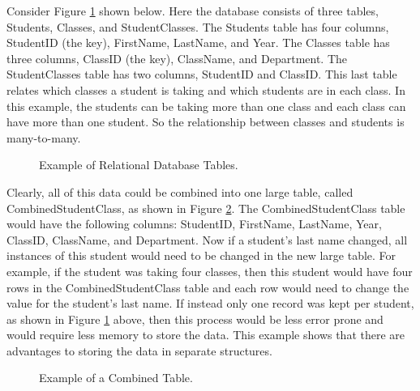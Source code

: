 \documentclass{article}[11pt]
\begin{document}
Consider Figure \ref{Fig:DBTab} shown below.  Here the database consists of
three tables, Students, Classes, and StudentClasses.  The Students table has
four columns, StudentID (the key), FirstName, LastName, and Year.  The Classes
table has three columns, ClassID (the key), ClassName, and Department.  The
StudentClasses table has two columns, StudentID and ClassID.  This last table
relates which classes a student is taking and which students are in
each class.  In this example, the students can be taking more than one class
and each class can have more than one student.  So the relationship between
classes and students is many-to-many.  


\begin{figure}[ht]
  \begin{center}
    \caption{ Example of Relational Database Tables. }
    \label{Fig:DBTab}
  \end{center}
\end{figure}

Clearly, all of this data could be combined into one large
table, called CombinedStudentClass, as shown in Figure \ref{Fig:OneDBTab}.
The CombinedStudentClass table would have the following columns: StudentID,
FirstName, LastName, Year, ClassID, ClassName, and Department.  Now if a
student's last name changed, all instances of this student would need to be
changed in the new large table.  For example, if the student was taking four
classes, then this student would have four rows in the CombinedStudentClass
table and each row would need to change the value for the student's last name.
If instead only one record was kept per student, as shown in Figure
\ref{Fig:DBTab} above, then this process would be less error prone and would
require less memory to store the data. This example shows that there are
advantages to storing the data in separate structures. 


\begin{figure}[ht]
  \begin{center}
    \caption{ Example of a Combined Table. }
    \label{Fig:OneDBTab}
  \end{center}
\end{figure}
\end{document}

